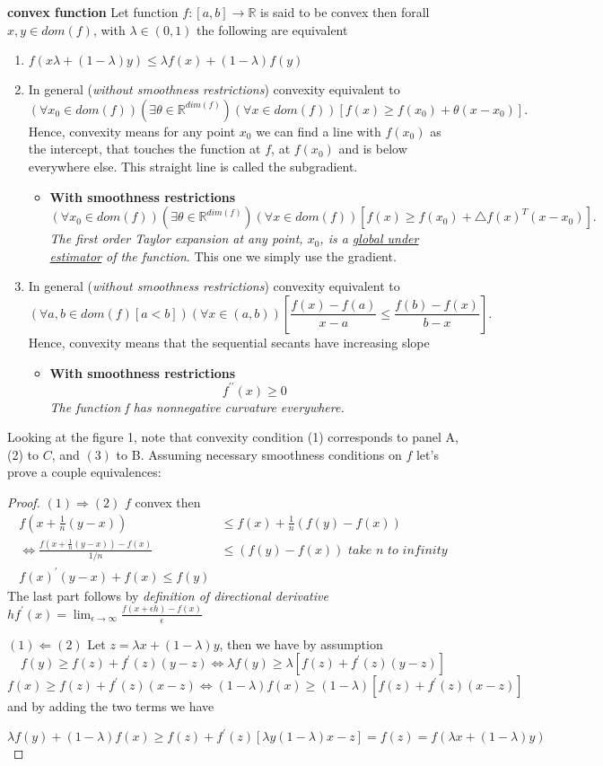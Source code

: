 \documentclass[11pt]{article}
\theoremstyle{quest}
\newcommand{\R}{\mathbb{R}}
\begin{document}
\textbf{convex function} Let function $f:[a,b]\rightarrow \R$ is said to be convex then forall $x,y\in dom(f)$, with $\lambda\in(0,1)$ the following are  equivalent
\begin{enumerate}
	\item  $f(x\lambda +(1-\lambda)y)\le \lambda f(x)+(1-\lambda)f(y)$ 
	\item In general (\textit{without smoothness restrictions}) convexity equivalent to $$(\forall x_0 \in dom(f))(\exists \theta \in \R^{dim(f)})(\forall x \in dom(f))[ f(x) \ge f(x_0)+\theta(x-x_0)].$$ Hence, convexity means for any point $x_0$ we can find a line with $f(x_0)$ as the intercept, that touches the function at $f$, at $f(x_0)$ and is below everywhere else. This straight line is called the subgradient.
	\begin{itemize} 
		\item  \textbf{With smoothness restrictions}   $$(\forall x_0 \in dom(f))(\exists \theta \in \R^{dim(f)})(\forall x \in dom(f))[ f(x) \ge f(x_0)+\triangle f(x)^T(x-x_0)].$$ \textit{The first order Taylor expansion at any point, $x_0$, is a \underline{global under estimator} of the function}. This one we simply use the gradient.
	\end{itemize} 
	\item In general (\textit{without smoothness restrictions}) convexity equivalent to $$(\forall a,b\in dom(f)[a<b]) (\forall x \in (a,b) )[\frac{f(x)-f(a)}{x-a}\le \frac{f(b)-f(x)}{b-x}].$$ Hence, convexity means that the sequential secants have increasing slope
	\begin{itemize}
	\item \textbf{With smoothness restrictions} $$f^{\prime\prime}(x) \ge 0 $$ \textit{ The function f has nonnegative curvature everywhere. }
	\end{itemize} 

\end{enumerate}
Looking at the figure 1, note that convexity condition (1) corresponds to panel A, (2) to $C$, and $(3)$ to B. 
 Assuming necessary smoothness conditions on $f$ let's prove a couple equivalences: 
\begin{proof}
$(1)\Rightarrow (2)$
$f$ convex then 
\begin{align*}
f(x+\frac{1}{n}(y-x))&\le f(x)+\frac{1}{n}(f(y)-f(x))\\
\iff \frac{f(x+\frac{1}{n}(y-x))-f(x)}{1/n}&\le(f(y)-f(x)) \textit{ take $n $ to infinity} \\
f(x)^\prime(y-x)+f(x)\le f(y)
\end{align*}
The last part follows by \textit{definition of directional derivative} $hf^{\prime}(x)=\lim_{\epsilon\rightarrow \infty}\frac{f(x+\epsilon h)-f(x)}{\epsilon}$

$(1)\Leftarrow (2)$
Let $z=\lambda x + (1-\lambda)y$, then we have by assumption
$$f(y)\ge f(z)+f^\prime(z)(y-z) \iff \lambda f(y)\ge \lambda[f(z)+f^\prime(z)(y-z)]$$
$$f(x)\ge f(z)+f^\prime(z)(x-z) \iff (1-\lambda) f(x)\ge (1-\lambda)[f(z)+f^\prime(z)(x-z)]$$
and by adding the two terms we have

$$ \lambda f(y) + (1-\lambda) f(x) \ge f(z)+f^\prime(z)[\lambda y (1-\lambda)x-z] = f(z) = f(\lambda x + (1-\lambda)y)$$
\end{proof}
\end{document}
